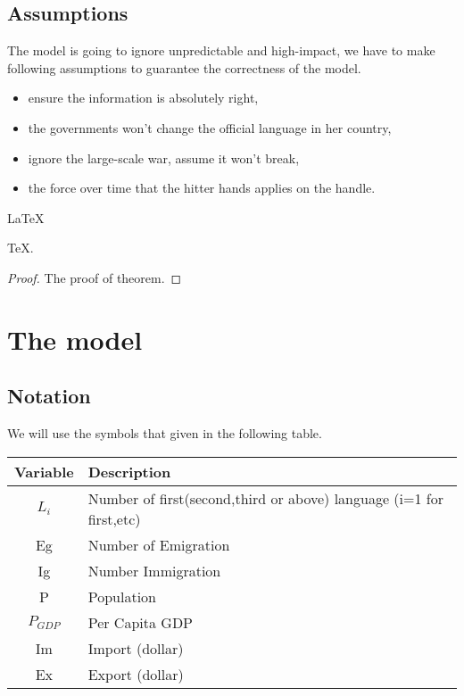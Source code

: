 \documentclass{mcmthesis}
\begin{document}
\subsection{Assumptions}
The model is going to ignore unpredictable and high-impact, we have to make following assumptions to guarantee the correctness of the model.
\begin{itemize}
\item ensure the information is absolutely right, 
\item the governments won't change the official language in her country,
\item ignore the large-scale war, assume it won't break,
\item the force over time that the hitter hands applies on the handle.
\end{itemize}

\begin{Theorem} \label{thm:latex}
\LaTeX
\end{Theorem}
\begin{Lemma} \label{thm:tex}
\TeX .
\end{Lemma}
\begin{proof}
The proof of theorem.
\end{proof}
\section{The model}
\subsection{Notation}
We will use the symbols that given in the following table.
\begin{table}[htbp]
\begin{center}
\begin{tabular}{c|l}
\hline
\multicolumn{1}{l}{Variable} & Description                                      \\
\hline
$L_i$                            & Number of first(second,third or above) language (i=1 for first,etc)                                       \\
Eg                           &Number of Emigration                                       \\
Ig                           &Number Immigration \\
P                            & Population                                \\
$P_{GDP}   $                         & Per Capita GDP                                   \\
Im                            & Import (dollar)                                       \\
Ex                            & Export (dollar)                                   \\
\hline
\end{tabular}
\end{center}
\end{table}
\end{document}
